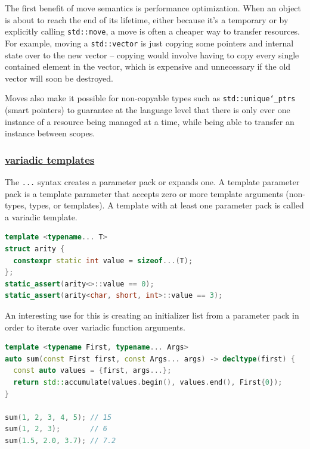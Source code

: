 The first benefit of move semantics is performance optimization. When an 
object is about to reach the end of its lifetime, either because it's a 
temporary or by explicitly calling \texttt{std::move}, a move is often a cheaper 
way to transfer resources. For example, moving a \texttt{std::vector} is just 
copying some pointers and internal state over to the new vector -- copying 
would involve having to copy every single contained element in the vector, 
which is expensive and unnecessary if the old vector will soon be destroyed.

Moves also make it possible for non-copyable types such as \texttt{std::unique\char`_ptrs} 
(smart pointers) to guarantee at the language level that there is only 
ever one instance of a resource being managed at a time, while being able 
to transfer an instance between scopes.

\subsubsection{\href{https://github.com/AnthonyCalandra/modern-cpp-features/tree/master\#variadic-templates}
                    {variadic templates}}
The \verb|...| syntax creates a parameter pack or expands one.
\newline
A template parameter pack is a template parameter that accepts zero or 
more template arguments (non-types, types, or templates).
\newline
A template with at least one parameter pack is called a variadic template.

\begin{lstlisting}[language=C++]
template <typename... T>
struct arity {
  constexpr static int value = sizeof...(T);
};
static_assert(arity<>::value == 0);
static_assert(arity<char, short, int>::value == 3);
\end{lstlisting}

An interesting use for this is creating an initializer list from a 
parameter pack in order to iterate over variadic function arguments.

\begin{lstlisting}[language=C++]
template <typename First, typename... Args>
auto sum(const First first, const Args... args) -> decltype(first) {
  const auto values = {first, args...};
  return std::accumulate(values.begin(), values.end(), First{0});
}

sum(1, 2, 3, 4, 5); // 15
sum(1, 2, 3);       // 6
sum(1.5, 2.0, 3.7); // 7.2
\end{lstlisting}

